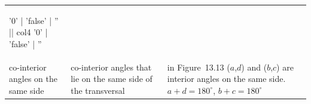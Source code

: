 \begin{table}[H]
\begin{center}
\begin{xtabular*}{\mytablewidth}[t]{|p{3cm}|p{3cm}|p{3cm}|p{20\mystarwidth}|}
\begin{center}
      \vspace{2pt}
    \vspace{.1in}
    
    \end{center}



    \addtocounter{footnote}{-0}
    
'0' | 'false' | '' || col4 '0' | 'false' | ''
     \tabularnewline{}
    
    
        co-interior angles on the same side &
    
    
        co-interior angles that lie on the same side of the transversal &
    
    
        in Figure~13.13 (\begin{math}a\end{math},\begin{math}d\end{math}) and
(\begin{math}b\end{math},\begin{math}c\end{math}) are interior angles on the
same side. \begin{math}a+d={180}^{\circ }\end{math},
\begin{math}b+c={180}^{\circ }\end{math} &
    
    
        
                  
    \setcounter{subfigure}{0}


\end{xtabular*}
\end{center}
\end{table}
